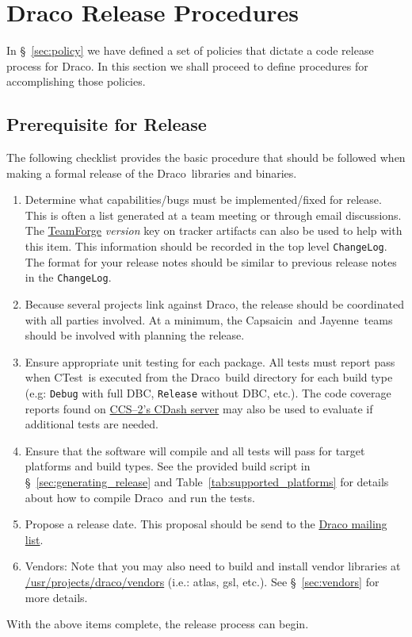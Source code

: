 \documentclass[note]{newmemo}
\newcommand{\draco}{{\normalfont\small\sffamily Draco}}
\newcommand{\jayenne}{{\normalfont\small\sffamily Jayenne}}
\newcommand{\capsaicin}{{\normalfont\small\sffamily Capsaicin}}
\newcommand{\ctest}{\textsf{CTest}}
\begin{document}

\section{Draco Release Procedures}
\label{sec:procedures}

In \S~\ref{sec:policy} we have defined a set of policies that dictate
a code release process for \draco.  In this section we shall proceed
to define procedures for accomplishing those policies.  


\subsection{Prerequisite for Release}
\label{sec:prereq}

The following checklist provides the basic procedure that should be
followed when making a formal release of the \draco\ libraries and
binaries.
\begin{enumerate}
\item Determine what capabilities/bugs must be implemented/fixed for
  release.  This is often a list generated at a team meeting or
  through email discussions. The
  \href{http://tf.lanl.gov/sf/projects/draco}{TeamForge} {\it version}
  key on tracker artifacts can also be used to help with this item.
  This information should be recorded in the top level
  \texttt{ChangeLog}.  The format for your release notes should be
  similar to previous release notes in the \texttt{ChangeLog}.
\item Because several projects link against \draco, the release should
  be coordinated with all parties involved.  At a minimum, the
  \capsaicin\ and \jayenne\ teams should be involved with planning the
  release.
\item Ensure appropriate unit testing for each package.  All tests
  must report pass when \ctest\ is executed from the \draco\ build
  directory for each build type (e.g: \texttt{Debug} with full DBC,
  \texttt{Release} without DBC, etc.). The code coverage reports found
  on \href{http://coder.lanl.gov/cdash}{CCS--2's CDash server} may
  also be used to evaluate if additional tests are needed.
\item Ensure that the software will compile and all tests will pass
  for target platforms and build types. See the provided build script
  in \S~\ref{sec:generating_release} and
  Table~\ref{tab:supported_platforms} for details about how to compile
  \draco\ and run the tests.
\item Propose a release date.  This proposal should be send to the
  \href{mailto:draco@lanl.gov}{Draco mailing list}. 
\item Vendors: Note that you may also need to build and install vendor libraries
  at \url{/usr/projects/draco/vendors} (i.e.: atlas, gsl, etc.).  See
  \S~\ref{sec:vendors} for more details. 
\end{enumerate}
With the above items complete, the release process can begin.
\end{document}
